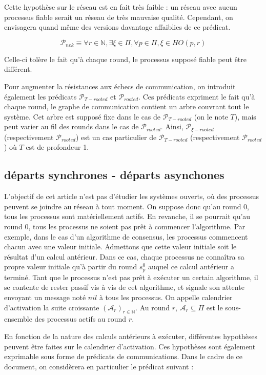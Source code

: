 \documentclass{article}
\begin{document}
Cette hypothèse sur le réseau est en fait très faible : un réseau avec aucun processus fiable serait un réseau de très mauvaise qualité. Cependant, on envisagera quand même des versions
davantage affaiblies de ce prédicat.

$$\mathcal{P}_{nek} \equiv \forall r \in \mathds{N}, \exists \xi \in \Pi, \forall p \in \Pi, \xi \in HO(p,r)$$

Celle-ci tolère le fait qu'à chaque round, le processus supposé fiable peut être différent.

Pour augmenter la résistances aux échecs de communication, on introduit également les prédicats $\mathcal{P}_{T-rooted}$ et $\mathcal{P}_{rooted}$.
Ces prédicats expriment le fait qu'à chaque round, le graphe de communication contient un arbre couvrant tout le système.
Cet arbre est supposé fixe dans le cas de $\mathcal{P}_{T-rooted}$ (on le note $T$), mais peut varier au fil des rounds dans le cas de $\mathcal{P}_{rooted}$.
Ainsi, $\mathcal{P}_{\xi-rooted}$ (respectivement $\mathcal{P}_{rooted}$) est un cas particulier de $\mathcal{P}_{T-rooted}$ (respectivement $\mathcal{P}_{rooted}$) où $T$ est de profondeur 1.

\subsection{départs synchrones - départs asynchones}

L'objectif de cet article n'est pas d'étudier les systèmes ouverts, où des processus peuvent se joindre au réseau à tout moment.
On suppose donc qu'au round 0, tous les processus sont matériellement actifs. En revanche, il se pourrait qu'au round 0, tous les processus ne soient pas prêt à commencer l'algorithme.
Par exemple, dans le cas d'un algorithme de consensus, les processus commencent chacun avec une valeur initiale. Admettons que cette valeur initiale soit le résultat d'un calcul antérieur.
Dans ce cas, chaque processus ne connaîtra sa propre valeur initiale qu'à partir du round $s^0_p$ auquel ce calcul antérieur a terminé.
Tant que le processus n'est pas prêt à exécuter un certain algorithme, il se contente de rester passif vis à vis de cet algorithme,
et signale son attente envoyant un message noté $nil$ à tous les processus.
On appelle calendrier d'activation la suite croissante $(\mathcal{A}_r)_{r \in \mathds{N}}$. Au round $r$, $\mathcal{A}_r \subseteq \Pi$ est le sous-ensemble des processus actifs au round $r$.

En fonction de la nature des calculs antérieurs à exécuter, différentes hypothèses peuvent être faites sur le calendrier d'activation.
Ces hypothèses sont également exprimable sous forme de prédicats de communications.
Dans le cadre de ce document, on considèrera en particulier le prédicat suivant :
\end{document}
